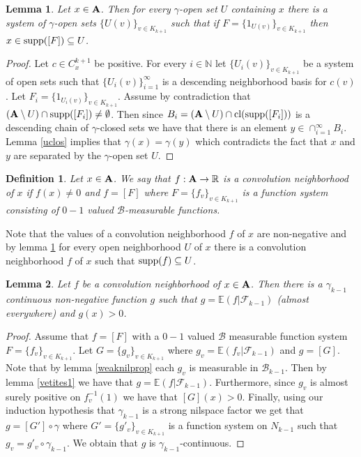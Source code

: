 \documentclass [11pt] {article}
\newtheorem{lemma}{Lemma}[section]
\newtheorem{definition}{Definition}[section]
\def\cl{{\rm cl}}
\def\bA{{\bf A}}
\begin{document}
\begin{lemma}\label{opcontconv} Let $x\in\bA$. Then for every $\gamma$-open set $U$ containing $x$ there is a system of $\gamma$-open sets $\{U(v)\}_{v\in K_{k+1}}$ such that if $F=\{1_{U(v)}\}_{v\in K_{k+1}}$ then $x\in{\rm supp}([F])\subseteq U$.
\end{lemma}

\begin{proof} Let $c\in C^{k+1}_x$ be positive. For every $i\in\mathbb{N}$ let $\{U_i(v)\}_{v\in K_{k+1}}$ be a system of open sets such that $\{U_i(v)\}_{i=1}^\infty$ is a descending neighborhood basis for $c(v)$. Let $F_i=\{1_{U_i(v)}\}_{v\in K_{k+1}}$. Assume by contradiction that $(\bA\setminus U)\cap{\rm supp}([F_i])\neq\emptyset$. Then since $B_i=(\bA\setminus U)\cap\cl({\rm supp}([F_i]))$ is a descending chain of $\gamma$-closed sets we have that there is an element $y\in\cap_{i=1}^\infty B_i$. Lemma \ref{uclos} implies that $\gamma(x)=\gamma(y)$ which contradicts the fact that $x$ and $y$ are separated by the $\gamma$-open set $U$. 
\end{proof}

\begin{definition} Let $x\in\bA$. We say that $f:\bA\rightarrow\mathbb{R}$ is a convolution neighborhood of $x$ if $f(x)\neq 0$ and $f=[F]$ where $F=\{f_v\}_{v\in K_{k+1}}$ is a function system consisting of $0-1$ valued $\mathcal{B}$-measurable functions. 
\end{definition}

Note that the values of a convolution neighborhood $f$ of $x$ are non-negative and by lemma \ref{opcontconv} for every open neighborhood $U$ of $x$ there is a convolution neighborhood $f$ of $x$ such that ${\rm supp}(f)\subseteq U$.

\begin{lemma}\label{convnproj} Let $f$ be a convolution neighborhood of $x\in\bA$. Then there is a $\gamma_{k-1}$ continuous non-negative function $g$ such that $g=\mathbb{E}(f|\mathcal{F}_{k-1})$ (almost everywhere) and $g(x)>0$.
\end{lemma}

\begin{proof} Assume that $f=[F]$ with a $0-1$ valued $\mathcal{B}$ measurable function system $F=\{f_v\}_{v\in K_{k+1}}$. Let $G=\{g_v\}_{v\in K_{k+1}}$ where $g_v=\mathbb{E}(f_v|\mathcal{F}_{k-1})$ and $g=[G]$. Note that by lemma \ref{weaknilprop} each $g_v$ is measurable in $\mathcal{B}_{k-1}$. Then by lemma \ref{vetites1} we have that $g=\mathbb{E}(f|\mathcal{F}_{k-1})$. Furthermore, since $g_v$ is almost surely positive on $f^{-1}_v(1)$ we have that $[G](x)>0$. Finally, using our induction hypothesis that $\gamma_{k-1}$ is a strong nilspace factor we get that $g=[G']\circ\gamma$ where $G'=\{g'_v\}_{v\in K_{k+1}}$ is a function system on $N_{k-1}$ such that $g_v=g'_v\circ\gamma_{k-1}$. We obtain that $g$ is $\gamma_{k-1}$-continuous. 
\end{proof}
\end{document}
